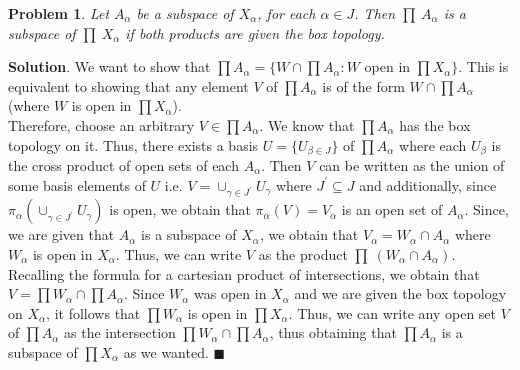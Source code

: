 \documentclass[12pt]{article}
\renewcommand{\=}[1]{\stackrel{#1}{=}} %
\newtheorem{p}{Problem}[section]
\theoremstyle{definition}
\newenvironment{s}{%
        \begin{trivlist} \item \textbf{Solution}. }{%
            \hspace*{\fill} $\blacksquare$\end{trivlist}}%
\begin{document}
\begin{p}
    Let $A_{\alpha}$ be a subspace of $X_{\alpha}$, for each $\alpha\in J$. Then $\prod\:A_{\alpha}$ is a subspace of $\prod\:X_{\alpha}$ if both
    products are given the box topology.
\end{p}
\begin{s}
    We want to show that $\prod A_{\alpha} = \{W \cap \prod A_{\alpha}: W$ open in $\prod X_{\alpha}\}$. This is equivalent to showing that any element
    $V$ of $\prod A_{\alpha}$ is of the form $W \cap \prod A_{\alpha}$ (where $W$ is open in $\prod X_{\alpha}$).\\
    Therefore, choose an arbitrary $V \in \prod A_{\alpha}$. We know that $\prod A_{\alpha}$ has the box topology on it. Thus, there exists a basis
    $U = \{U_{\beta\in J}\}$ of $\prod A_{\alpha}$ where each $U_{\beta}$ is the cross product of open sets of each $A_{\alpha}$. Then $V$ can be written
    as the union of some basis elements of $U$ i.e. $V = \cup_{\gamma\in J^{'}} U_{\gamma}$ where $J^{'}\subseteq J$ and additionally, 
    since $\pi_{\alpha}(\cup_{\gamma\in J^{'}} U_{\gamma})$ is open, we obtain that $\pi_{\alpha}(V) = V_{\alpha}$ is an open set of $A_{\alpha}$. Since, we are
    given that $A_{\alpha}$ is a subspace of $X_{\alpha}$, we obtain that $V_{\alpha} = W_{\alpha} \cap A_{\alpha}$ where $W_{\alpha}$ is open in $X_{\alpha}$.
    Thus, we can write $V$ as the product $\prod\: (W_{\alpha} \cap A_{\alpha})$. Recalling the formula for a cartesian product of intersections, we obtain that
    $V = \prod W_{\alpha} \cap \prod A_{\alpha}$. Since $W_{\alpha}$ was open in $X_{\alpha}$ and we are given the box topology on $X_{\alpha}$, it follows that
    $\prod W_{\alpha}$ is open in $\prod X_{\alpha}$. Thus, we can write any open set $V$ of $\prod A_{\alpha}$ as the intersection $\prod W_{\alpha} \cap 
    \prod A_{\alpha}$, thus obtaining that $\prod A_{\alpha}$ is a subspace of $\prod X_{\alpha}$ as we wanted.
\end{s}
\end{document}
